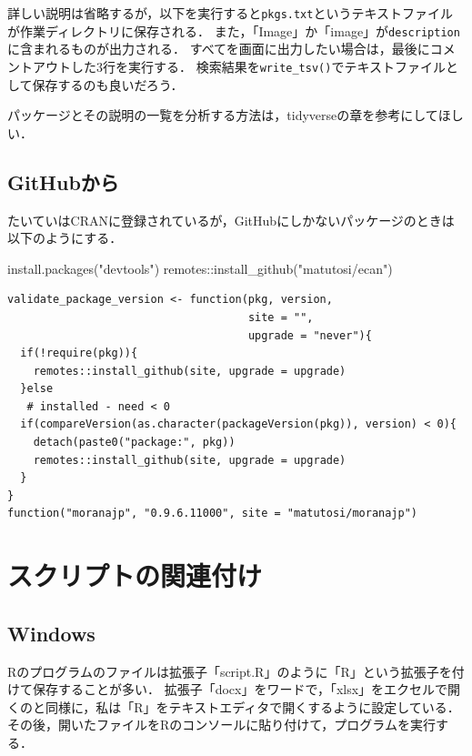 \documentclass[
]{article}
\newenvironment{Shaded}{\begin{snugshade}}{\end{snugshade}}
\newcommand{\FunctionTok}[1]{\textcolor[rgb]{0.00,0.00,0.00}{#1}}
\newcommand{\NormalTok}[1]{#1}
\newcommand{\SpecialCharTok}[1]{\textcolor[rgb]{0.00,0.00,0.00}{#1}}
\newcommand{\StringTok}[1]{\textcolor[rgb]{0.31,0.60,0.02}{#1}}
\begin{document}
詳しい説明は省略するが，以下を実行すると\texttt{pkgs.txt}というテキストファイルが作業ディレクトリに保存される．
また，「Image」か「image」が\texttt{description}に含まれるものが出力される．
すべてを画面に出力したい場合は，最後にコメントアウトした3行を実行する．
検索結果を\texttt{write\_tsv()}でテキストファイルとして保存するのも良いだろう．

パッケージとその説明の一覧を分析する方法は，tidyverseの章を参考にしてほしい．

\hypertarget{github}{%
\subsection{GitHubから}\label{github}}

たいていはCRANに登録されているが，GitHubにしかないパッケージのときは以下のようにする．

\begin{Shaded}
\begin{Highlighting}[]
\FunctionTok{install.packages}\NormalTok{(}\StringTok{"devtools"}\NormalTok{)}
\NormalTok{remotes}\SpecialCharTok{::}\FunctionTok{install\_github}\NormalTok{(}\StringTok{"matutosi/ecan"}\NormalTok{)}
\end{Highlighting}
\end{Shaded}

\begin{verbatim}
validate_package_version <- function(pkg, version, 
                                     site = "", 
                                     upgrade = "never"){
  if(!require(pkg)){
    remotes::install_github(site, upgrade = upgrade)
  }else
   # installed - need < 0
  if(compareVersion(as.character(packageVersion(pkg)), version) < 0){
    detach(paste0("package:", pkg))
    remotes::install_github(site, upgrade = upgrade)
  }
}
function("moranajp", "0.9.6.11000", site = "matutosi/moranajp")
\end{verbatim}

\hypertarget{assoc}{%
\section{スクリプトの関連付け}\label{assoc}}

\hypertarget{windows}{%
\subsection{Windows}\label{windows}}

Rのプログラムのファイルは拡張子「script.R」のように「R」という拡張子を付けて保存することが多い．
拡張子「docx」をワードで，「xlsx」をエクセルで開くのと同様に，私は「R」をテキストエディタで開くするように設定している．
その後，開いたファイルをRのコンソールに貼り付けて，プログラムを実行する．
\end{document}
